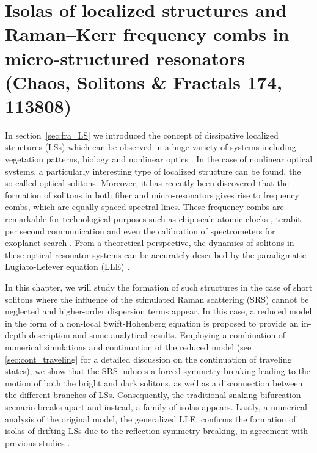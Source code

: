 \chapter{Isolas of localized structures and Raman–Kerr frequency combs in micro-structured resonators (Chaos, Solitons \& Fractals 174, 113808)}

In section~\ref{sec:fra_LS} we introduced the concept of dissipative 
localized structures (LSs) which can be observed in a huge variety
of systems including vegetation patterns, biology and 
nonlinear optics \cite{tlidi2014localized,heimburg2005soliton}. In the case of nonlinear optical systems,
a particularly interesting type of localized structure can be found,
the so-called optical solitons. Moreover, it has recently been discovered that the formation of solitons
in both fiber and micro-resonators gives rise to frequency combs, which are equally
spaced spectral lines. These frequency combs are remarkable
for technological purposes such as chip-scale atomic clocks \cite{Jost2015clock}, terabit
per second communication \cite{marin2017microresonator} and even the calibration of spectrometers
for exoplanet search \cite{suh2019searching}. From a theoretical perspective, the dynamics
of solitons in these optical resonator systems can be accurately described 
by the paradigmatic Lugiato-Lefever equation (LLE) \cite{lugiatolefever1987}.

In this chapter, we will study the formation of such structures in the
case of short solitons where the influence of the stimulated Raman scattering (SRS)
cannot be neglected and higher-order dispersion terms appear. In this case, a reduced model
in the form of a non-local Swift-Hohenberg equation is proposed to provide an
in-depth description and some analytical results. Employing a combination of
numerical simulations and
continuation of the reduced model (see \ref{sec:cont_traveling} for a detailed discussion on the
continuation of traveling states), we show that the SRS induces a forced symmetry
breaking leading to the motion of both the bright and dark solitons, as well as a disconnection between 
the different branches of LSs. Consequently, the traditional snaking bifurcation scenario breaks
apart and instead, a family of isolas appears. Lastly, a numerical analysis of the
original model, the generalized LLE, confirms the formation of isolas of drifting LSs due
to the reflection symmetry breaking, in agreement with previous studies \cite{burke2009swift,parra2014third}.



